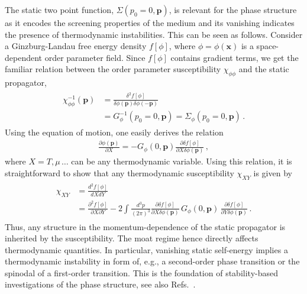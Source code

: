 \documentclass[reprint,english,superscriptaddress,preprintnumbers,amsmath,amssymb,aps,prd]{revtex4-2}
\begin{document}
The static two point function, $\Sigma(p_0=0,\boldsymbol{p})$, is relevant for the phase structure as it encodes the screening properties of the medium and its vanishing indicates the presence of thermodynamic instabilities. This can be seen as follows. Consider a Ginzburg-Landau free energy density $f[\phi]$, where $\phi = \phi(\boldsymbol{x})$ is a space-dependent order parameter field. Since $f[\phi]$ contains gradient terms, we get the familiar relation between the order parameter susceptibility $\chi_{\phi\phi}$ and the static propagator,
\begin{align}
\begin{split}
\chi_{\phi\phi}^{-1}(\boldsymbol{p}) &= \frac{\delta^2 f[\phi]}{\delta \phi(\boldsymbol{p})\delta \phi(-\boldsymbol{p})}\\[1ex]
&= G_\phi^{-1}(p_0=0,\boldsymbol{p}) = \Sigma_\phi(p_0=0,\boldsymbol{p})\,.
\end{split}
\end{align}
Using the equation of motion, one easily derives the relation
\begin{align}
\frac{\partial \phi(\boldsymbol{p})}{\partial X} = - G_\phi(0,\boldsymbol{p}) \frac{\partial \delta f[\phi]}{\partial X\delta\phi(\boldsymbol{p})}\,,
\end{align}
where $X = T,\mu\,\dots$ can be any thermodynamic variable.
Using this relation, it is straightforward to show that any thermodynamic susceptibility $\chi_{XY}$ is given by 
\begin{align}
\begin{split}
\chi_{XY} &= \frac{d^2 f[\phi]}{dXdY}\\[1ex]
&= \frac{\partial^2f[\phi]}{\partial X\partial Y} - 2\int\!\!\!\frac{d^3p}{(2\pi)^3}  \frac{\partial \delta f[\phi]}{\partial X\delta\phi(\boldsymbol{p})}\, G_\phi(0,\boldsymbol{p})\, \frac{\partial \delta f[\phi]}{\partial Y\delta\phi(\boldsymbol{p})}\,.
\end{split}
\end{align}
Thus, any structure in the momentum-dependence of the static propagator is inherited by the susceptibility. The moat regime hence directly affects thermodynamic quantities. In particular, vanishing static self-energy implies a thermodynamic instability in form of, e.g., a second-order phase transition or the spinodal of a first-order transition. This is the foundation of stability-based investigations of the phase structure, see also Refs.\ \cite{Weinberg:1987vp, Buballa:2014tba, Haensch:2023sig, Motta:2023pks, Fu:2024rto, Motta:2024rvk}.
\end{document}
